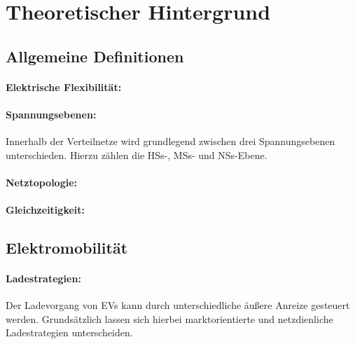 \section{Theoretischer Hintergrund}

\subsection{Allgemeine Definitionen}

\paragraph{Elektrische Flexibilität:}


\paragraph{Spannungsebenen:}

Innerhalb der Verteilnetze wird grundlegend zwischen drei Spannungsebenen unterschieden. Hierzu zählen die \glspl{HS}-, \glspl{MS}- und \glspl{NS}-Ebene.



\paragraph{Netztopologie:}


\paragraph{Gleichzeitigkeit:}

\subsection{Elektromobilität}

\paragraph{Ladestrategien:}

Der Ladevorgang von \glspl{EV} kann durch unterschiedliche äußere Anreize gesteuert werden. Grundsätzlich lassen sich hierbei marktorientierte und netzdienliche Ladestrategien unterscheiden.


